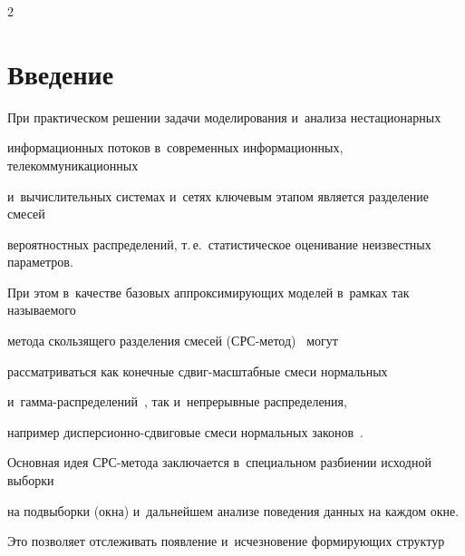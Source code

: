 












\thispagestyle{headings}



\begin{multicols}{2}



\label{st\stat}





\section{Введение}



При практическом решении задачи моделирования и~анализа нестационарных 

информационных потоков в~современных информационных, телекоммуникационных 

и~вычислительных системах и~сетях ключевым этапом является разделение смесей 

вероятностных распределений, т.\,е.\ статистическое оценивание неизвестных параметров. 

При этом в~качестве базовых аппроксимирующих моделей в~рамках так называемого 

метода скользящего разделения смесей (СРС-ме\-тод)~\cite{Korolev2011} могут 

рассматриваться как конечные сдвиг-мас\-штаб\-ные смеси нормальных 

и~гам\-ма-рас\-пре\-де\-ле\-ний~\cite{Korolev2011}, так и~непрерывные распределения, 

например дис\-пер\-си\-он\-но-сдви\-го\-вые смеси нормальных законов~\cite{Korolev2015}. 

Основная идея СРС-ме\-то\-да заключается в~специальном разбиении исходной выборки 

на подвыборки (окна) и~дальнейшем анализе поведения данных на каж\-дом окне. 

Это позволяет отслеживать появление и~исчезновение формирующих структур 


\end{multicols}
